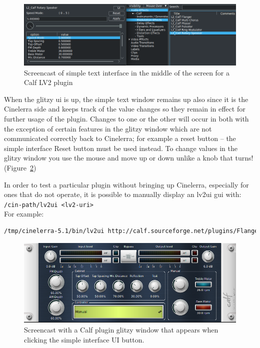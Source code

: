 \begin{figure}[htpb]
    \centering
    \includegraphics[width=1.0\linewidth]{images/calf.png}
    \caption{Screencast of simple text interface in the middle of the screen for a Calf LV2 plugin}
    \label{fig:calf}
\end{figure}

When the glitzy ui is up, the simple text window remains up also since it is the Cinelerra side and keeps track of the value changes so they remain in effect for further usage of the plugin. Changes to one or the other will occur in both with the exception of certain features in the glitzy window which are not communicated correctly back to Cinelerra; for example a reset button -- the simple interface Reset button must be used instead. To change values in the glitzy window you use the mouse and move up or down unlike a knob that turns! (Figure~\ref{fig:calf02})

In order to test a particular plugin without bringing up Cinelerra, especially for ones that do not operate, it is possible to manually display an lv2ui gui with: \\
\texttt{/cin-path/lv2ui <lv2-uri>} \\
For example:

\begin{lstlisting}[language=Bash,numbers=none]
/tmp/cinelerra-5.1/bin/lv2ui http://calf.sourceforge.net/plugins/Flanger
\end{lstlisting}

\begin{figure}[htpb]
    \centering
    \includegraphics[width=0.8\linewidth]{images/calf02.png}
    \caption{Screencast with a Calf plugin glitzy window that appears when clicking the simple interface UI button.}
    \label{fig:calf02}
\end{figure}

